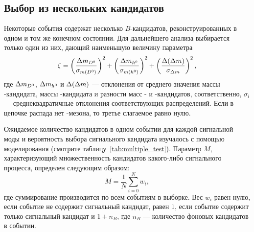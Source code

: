 \subsection{Выбор из нескольких кандидатов}
Некоторые события содержат несколько $B$-кандидатов, реконструированных в одном и том же конечном состоянии.  
Для дальнейшего анализа выбирается только один из них, дающий наименьшую величину параметра
\begin{equation}\label{eq:mult}
 \zeta =  \left(\frac{\Delta m_{D^0}}{\sigma_{m(D^0)}}\right)^2 + \left(\frac{\Delta m_{h^0}}{\sigma_{m(h^0)}}\right)^2 + \left(\frac{\Delta (\Delta m)}{\sigma_{\Delta m}}\right)^2,
\end{equation}
где $\Delta m_{D^0}$, $\Delta m_{h^0}$ и $\Delta(\Delta m)$ --- отклонения от среднего значения массы \dn-кандидата, массы \hn-кандидата и разности масс \dst- и \dn-кандидатов, соответственно,  $\sigma_i$ --- среднеквадратичные отклонения соответствующих распределений.  Если в цепочке распада нет \dstn-мезона, то третье слагаемое равно нулю.

Ожидаемое количество кандидатов в одном событии для каждой сигнальной моды и вероятность выбора сигнального кандидата изучалось с помощью моделирования (смотрите таблицу~\ref{tab:multiple_test}).  Параметр $M$, характеризующий множественность кандидатов какого-либо сигнального процесса, определен следующим образом:
\begin{equation}\label{eq:multpl}
 M = \frac{1}{N}\sum\limits_{i=0}^{N}w_i,
\end{equation}
где суммирование производится по всем событиям в выборке.  Вес $w_i$ равен нулю, если событие не содержит сигнальный кандидат,  равен $1$, если событие содержит только сигнальный кандидат и $1+n_B$, где $n_B$ --- количество фоновых кандидатов в событии.

